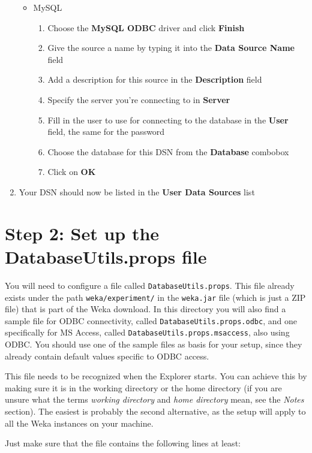 \begin{enumerate}
\begin{itemize}
		\item MySQL
		\begin{enumerate}
			\item Choose the \textbf{MySQL ODBC} driver and click \textbf{Finish}
			\item Give the source a name by typing it into the \textbf{Data Source Name} field
			\item Add a description for this source in the \textbf{Description} field
			\item Specify the server you're connecting to in \textbf{Server}
			\item Fill in the user to use for connecting to the database in the \textbf{User} field, the same for the password
			\item Choose the database for this DSN from the \textbf{Database} combobox
			\item Click on \textbf{OK}
		\end{enumerate}
	\end{itemize}
	\item Your DSN should now be listed in the \textbf{User Data Sources} list
\end{enumerate}

\section*{Step 2: Set up the DatabaseUtils.props file}
You will need to configure a file called \texttt{DatabaseUtils.props}. This file already exists under the path \texttt{weka/experiment/} in the \texttt{weka.jar} file (which is just a ZIP file) that is part of the Weka download. In this directory you will also find a sample file for ODBC connectivity, called \texttt{DatabaseUtils.props.odbc}, and one specifically for MS Access, called \texttt{DatabaseUtils.props.msaccess}, also using ODBC. You should use one of the sample files as basis for your setup, since they already contain default values specific to ODBC access.

This file needs to be recognized when the Explorer starts. You can achieve this by making sure it is in the working directory or the home directory (if you are unsure what the terms \textit{working directory} and \textit{home directory} mean, see the \textit{Notes} section). The easiest is probably the second alternative, as the setup will apply to all the Weka instances on your machine.

Just make sure that the file contains the following lines at least:

